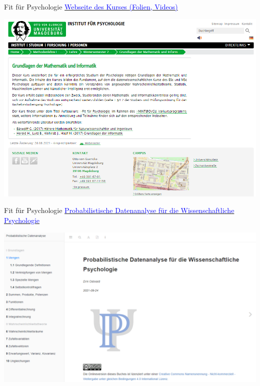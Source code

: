 \documentclass[
  8pt,
  ignorenonframetext,
]{beamer}
\begin{document}
\begin{frame}[t]{Fit für Psychologie}
\protect\hypertarget{fit-fuxfcr-psychologie-1}{}
\href{https://www.ipsy.ovgu.de/Institut/Abteilungen+des+Institutes/Methodenlehre+I+_+Experimentelle+und+Neurowissenschaftliche+Psychologie/Lehre/Wintersemester+2022/Grundlagen+der+Mathematik+und+Informatik.html}{\textcolor{blue}{Webseite des Kurses (Folien, Videos)}}

\vspace{5mm}

\begin{center}\includegraphics[width=0.75\linewidth]{../Abbildungen/glmi_0_kursseite} \end{center}
\end{frame}

\begin{frame}[t]{Fit für Psychologie}
\protect\hypertarget{fit-fuxfcr-psychologie-2}{}
\href{https://wasd.urz.uni-magdeburg.de/dostwald/}{\textcolor{blue}{Probabilistische Datenanalyse für die Wissenschaftliche Psychologie}}

\vspace{7mm}

\begin{center}\includegraphics[width=0.8\linewidth]{../Abbildungen/glmi_0_pdwp} \end{center}
\end{frame}
\end{document}
